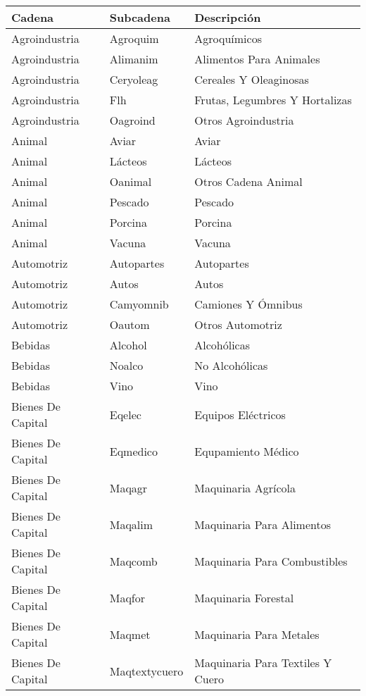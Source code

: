 \documentclass[class=article, crop=false]{standalone}
\begin{document}
\begin{longtable}[!ht]{lll}
	\textbf{Cadena} & \textbf{Subcadena} & \textbf{Descripción} \\
	\endhead
	Agroindustria & Agroquim & Agroquímicos \\
	Agroindustria & Alimanim & Alimentos Para Animales \\
	Agroindustria & Ceryoleag & Cereales Y Oleaginosas \\
	Agroindustria & Flh & Frutas, Legumbres Y Hortalizas \\
	Agroindustria & Oagroind & Otros Agroindustria \\
	Animal & Aviar & Aviar \\
	Animal & Lácteos & Lácteos \\
	Animal & Oanimal & Otros Cadena Animal \\
	Animal & Pescado & Pescado \\
	Animal & Porcina & Porcina \\
	Animal & Vacuna & Vacuna \\
	Automotriz & Autopartes & Autopartes \\
	Automotriz & Autos & Autos \\
	Automotriz & Camyomnib & Camiones Y Ómnibus \\
	Automotriz & Oautom & Otros Automotriz \\
	Bebidas & Alcohol & Alcohólicas \\
	Bebidas & Noalco & No Alcohólicas \\
	Bebidas & Vino & Vino \\
	Bienes De Capital & Eqelec & Equipos Eléctricos \\
	Bienes De Capital & Eqmedico & Equpamiento Médico \\
	Bienes De Capital & Maqagr & Maquinaria Agrícola \\
	Bienes De Capital & Maqalim & Maquinaria Para Alimentos \\
	Bienes De Capital & Maqcomb & Maquinaria Para Combustibles \\
	Bienes De Capital & Maqfor & Maquinaria Forestal \\
	Bienes De Capital & Maqmet & Maquinaria Para Metales \\
	Bienes De Capital & Maqtextycuero & Maquinaria Para Textiles Y Cuero \\

\end{longtable}
\end{document}
